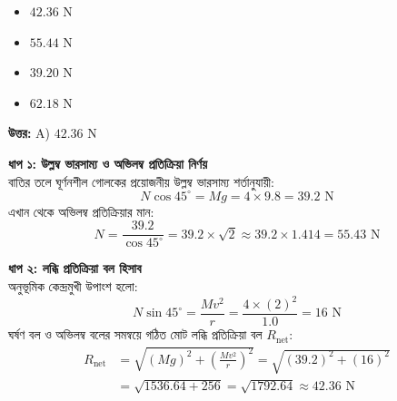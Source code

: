 \documentclass[12pt, a4paper]{article}
\begin{document}
\begin{itemize}[label={}, leftmargin=1cm, itemsep=0.5em]
\item[\textbf{A)}] $42.36\text{ N}$
\item[\textbf{B)}] $55.44\text{ N}$
\item[\textbf{C)}] $39.20\text{ N}$
\item[\textbf{D)}] $62.18\text{ N}$
\end{itemize}

\vspace{0.5em}
\begin{tcolorbox}[answerbox]
\textbf{\color{success} উত্তর:} A) $42.36\text{ N}$
\end{tcolorbox}
\vspace{1em}

\begin{tcolorbox}[solutionbox={সমাধান (Solution)}]
\noindent
\textbf{ধাপ ১: উল্লম্ব ভারসাম্য ও অভিলম্ব প্রতিক্রিয়া নির্ণয়} \\
বাতির তলে ঘূর্ণনশীল গোলকের প্রয়োজনীয় উল্লম্ব ভারসাম্য শর্তানুযায়ী:
\[ N \cos 45^\circ = M g = 4 \times 9.8 = 39.2\text{ N} \]
এখান থেকে অভিলম্ব প্রতিক্রিয়ার মান:
\[ N = \frac{39.2}{\cos 45^\circ} = 39.2 \times \sqrt{2} \approx 39.2 \times 1.414 = 55.43\text{ N} \]

\vspace{0.5em}
\noindent
\noindent
\textbf{ধাপ ২: লব্ধি প্রতিক্রিয়া বল হিসাব} \\[0.5em]
অনুভূমিক কেন্দ্রমুখী উপাংশ হলো:
\[ N \sin 45^\circ = \frac{M v^2}{r} = \frac{4 \times (2)^2}{1.0} = 16\text{ N} \]
ঘর্ষণ বল ও অভিলম্ব বলের সমন্বয়ে গঠিত মোট লব্ধি প্রতিক্রিয়া বল $R_{\text{net}}$:
\[
\begin{aligned}
R_{\text{net}} &= \sqrt{(M g)^2 + \left(\frac{M v^2}{r}\right)^2} = \sqrt{(39.2)^2 + (16)^2} \\
&= \sqrt{1536.64 + 256} = \sqrt{1792.64} \approx 42.36\text{ N}
\end{aligned}
\]
\end{tcolorbox}
\end{document}
